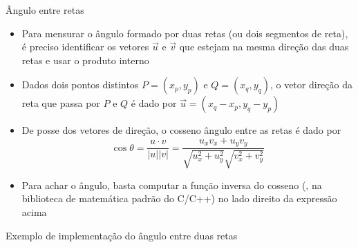 \begin{frame}[fragile]{Ângulo entre retas}

    \begin{itemize}
        \item Para mensurar o ângulo formado por duas retas (ou dois segmentos de reta), é preciso
            identificar os vetores $\vec{u}$ e $\vec{v}$ que estejam na mesma direção das duas retas e usar o produto interno
        \pause

        \item Dados dois pontos distintos $P = (x_p, y_p)$ e $Q = (x_q, y_q)$, o vetor direção da
            reta que passa por $P$ e $Q$ é dado por $\vec{u} = (x_q - x_p, y_q - y_p)$
        \pause

        \item De posse dos vetores de direção, o cosseno ângulo entre as retas é dado por
        \[
            \cos \theta = \frac{u \cdot v}{|u||v|} = \frac{u_xv_x + u_yv_y}{\sqrt{u_x^2 + u_y^2}\sqrt{v_x^2 + v_y^2}}
        \]
        \pause

        \item Para achar o ângulo, basta computar a função inversa do cosseno (, na
            biblioteca de matemática padrão do C/C++) no lado direito da expressão acima
    \end{itemize}

\end{frame}

\begin{frame}[fragile]{Exemplo de implementação do ângulo entre duas retas}
\end{frame}

